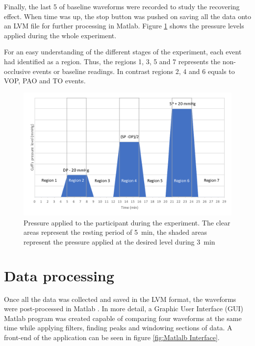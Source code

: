 Finally, the last \SI{5}{\min} of baseline waveforms were recorded to study the recovering effect. When time was up, the stop button was pushed on saving all the data onto an LVM file for further processing in Matlab. Figure \ref{fig:pressure applied} shows the pressure levels applied during the whole experiment.

For an easy understanding of the different stages of the experiment, each event had identified as a region. Thus, the regions 1, 3, 5 and 7 represents the non-occlusive events or baseline readings. In contrast regions 2, 4 and 6 equals to VOP, PAO and TO events.

\begin{figure}[!htpb]
	\centering
	\includegraphics[width=15cm,keepaspectratio]{figure3}
	\caption{Pressure applied to the participant during the experiment. The clear areas represent the resting period of \SI{5}{\minute}, the shaded areas represent the pressure applied at the desired level during \SI{3}{\minute}}
	\label{fig:pressure applied}
\end{figure}

\section{Data processing}
\label{section procedure 2}
Once all the data was collected and saved in the LVM format, the waveforms were post-processed in Matlab \cite{MATLAB:2016}. In more detail, a Graphic User Interface (GUI) Matlab program was created capable of comparing four waveforms at the same time while applying filters, finding peaks and windowing sections of data. A front-end of the application can be seen in figure \ref{fig:Matlalb Interface}.

